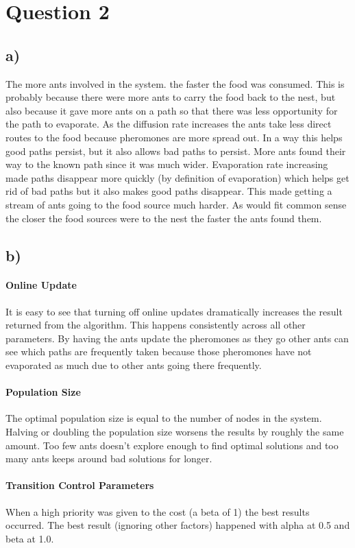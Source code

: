 \documentclass[12pt]{article}
\begin{document}
\section{Question 2} 
\subsection{a)} 

The more ants involved in the system. the faster the food was consumed. This is probably because there were more ants to carry the food back to the nest, but also because it gave more ants on a path so that there was less opportunity for the path to evaporate. As the diffusion rate increases the ants take less direct routes to the food because pheromones are more spread out. In a way this helps good paths persist, but it also allows bad paths to persist. More ants found their way to the known path since it was much wider. Evaporation rate increasing made paths disappear more quickly (by definition of evaporation) which helps get rid of bad paths but it also makes good paths disappear. This made getting a stream of ants going to the food source much harder. As would fit common sense the closer the food sources were to the nest the faster the ants found them.  

\subsection{b)}
\paragraph{Online Update}
It is easy to see that turning off online updates dramatically increases the result returned from the algorithm. This happens consistently across all other parameters. By having the ants update the pheromones as they go other ants can see which paths are frequently taken because those pheromones have not evaporated as much due to other ants going there frequently.

\paragraph{Population Size}
The optimal population size is equal to the number of nodes in the system. Halving or doubling the population size worsens the results by roughly the same amount. Too few ants doesn't explore enough to find optimal solutions and too many ants keeps around bad solutions for longer.

\paragraph{Transition Control Parameters}
When a high priority was given to the cost (a beta of 1) the best results occurred. The best result (ignoring other factors) happened with alpha at 0.5 and beta at 1.0. 
\end{document}
